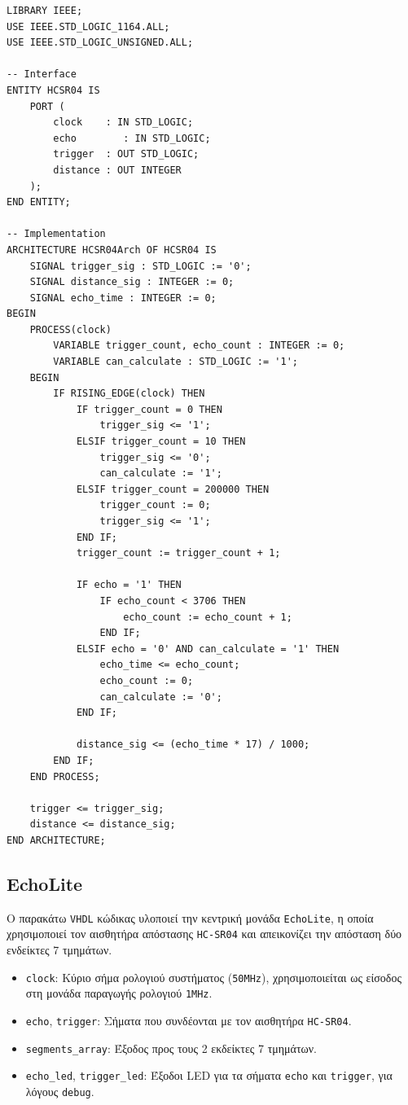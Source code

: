\documentclass[conference]{IEEEtran}
\begin{document}
\begin{lstlisting}[caption=HC SR-04 VHDL Code, label=lst:hcsr04]
LIBRARY IEEE;
USE IEEE.STD_LOGIC_1164.ALL;
USE IEEE.STD_LOGIC_UNSIGNED.ALL;

-- Interface
ENTITY HCSR04 IS
	PORT (
		clock    : IN STD_LOGIC;
		echo		: IN STD_LOGIC;
		trigger  : OUT STD_LOGIC;
		distance : OUT INTEGER
	);
END ENTITY;

-- Implementation
ARCHITECTURE HCSR04Arch OF HCSR04 IS
	SIGNAL trigger_sig : STD_LOGIC := '0';
	SIGNAL distance_sig : INTEGER := 0;
	SIGNAL echo_time : INTEGER := 0;
BEGIN
	PROCESS(clock)
		VARIABLE trigger_count, echo_count : INTEGER := 0;
		VARIABLE can_calculate : STD_LOGIC := '1';
	BEGIN
		IF RISING_EDGE(clock) THEN
			IF trigger_count = 0 THEN
				trigger_sig <= '1';
			ELSIF trigger_count = 10 THEN
				trigger_sig <= '0';
				can_calculate := '1';
			ELSIF trigger_count = 200000 THEN
				trigger_count := 0;
				trigger_sig <= '1';
			END IF;
			trigger_count := trigger_count + 1;

			IF echo = '1' THEN
				IF echo_count < 3706 THEN
					echo_count := echo_count + 1;
				END IF;
			ELSIF echo = '0' AND can_calculate = '1' THEN
				echo_time <= echo_count;
				echo_count := 0;
				can_calculate := '0';
			END IF;

			distance_sig <= (echo_time * 17) / 1000;
		END IF; 
	END PROCESS;

	trigger <= trigger_sig;
	distance <= distance_sig;
END ARCHITECTURE;
\end{lstlisting}

\subsection{EchoLite}
Ο παρακάτω \texttt{VHDL} κώδικας υλοποιεί την κεντρική μονάδα \texttt{EchoLite}, η οποία χρησιμοποιεί τον αισθητήρα απόστασης \texttt{HC-SR04} και απεικονίζει την απόσταση δύο ενδείκτες 7 τμημάτων.

\begin{itemize}
    \item \texttt{clock}: Κύριο σήμα ρολογιού συστήματος (\texttt{50MHz}), χρησιμοποιείται ως είσοδος στη μονάδα παραγωγής ρολογιού \texttt{1MHz}.
    \item \texttt{echo}, \texttt{trigger}: Σήματα που συνδέονται με τον αισθητήρα \texttt{HC-SR04}.
    \item \texttt{segments\_array}: Έξοδος προς τους 2 εκδείκτες 7 τμημάτων.
    \item \texttt{echo\_led}, \texttt{trigger\_led}: Έξοδοι LED για τα σήματα \texttt{echo} και \texttt{trigger}, για λόγους \texttt{debug}.
\end{itemize}
\end{document}
